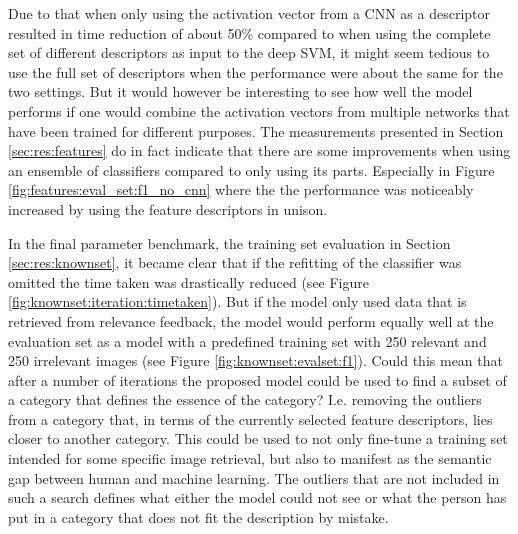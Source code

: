 Due to that when only using the activation vector from a CNN as a descriptor resulted in time reduction of about 50\% compared to when using the complete set of different descriptors as input to the deep SVM, it might seem tedious to use the full set of descriptors when the performance were about the same for the two settings. But it would however be interesting to see how well the model performs if one would combine the activation vectors from multiple networks that have been trained for different purposes. The measurements presented in Section \ref{sec:res:features} do in fact indicate that there are some improvements when using an ensemble of classifiers compared to only using its parts. Especially in Figure \ref{fig:features:eval_set:f1_no_cnn} where the the performance was noticeably increased by using the feature descriptors in unison. 

In the final parameter benchmark, the training set evaluation in Section \ref{sec:res:knownset}, it became clear that if the refitting of the classifier was omitted the time taken was drastically reduced (see Figure \ref{fig:knownset:iteration:timetaken}). But if the model only used data that is retrieved from relevance feedback, the model would perform equally well at the evaluation set as a model with a predefined training set with 250 relevant and 250 irrelevant images (see Figure \ref{fig:knownset:evalset:f1}). Could this mean that after a number of iterations the proposed model could be used to find a subset of a category that defines the essence of the category? I.e. removing the outliers from a category that, in terms of the currently selected feature descriptors, lies closer to another category. This could be used to not only fine-tune a training set intended for some specific image retrieval, but also to manifest as the semantic gap between human and machine learning. The outliers that are not included in such a search defines what either the model could not see or what the person has put in a category that does not fit the description by mistake.

